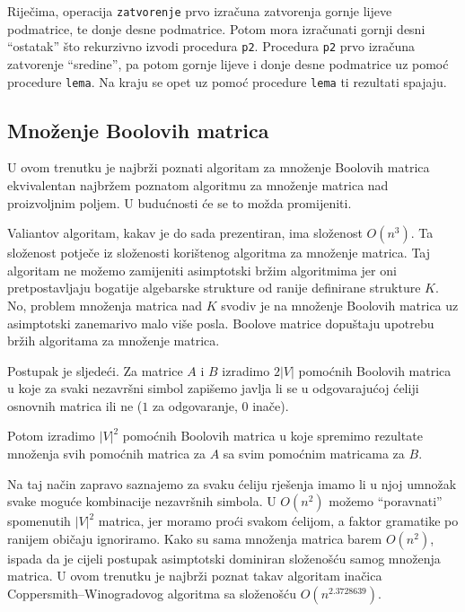 \documentclass[a4paper,oneside,12pt]{article} %
\begin{document}
    Riječima, operacija \verb|zatvorenje| prvo izračuna 
        zatvorenja gornje lijeve podmatrice, te donje desne podmatrice.
    Potom mora izračunati gornji desni ``ostatak''
        što rekurzivno izvodi procedura \verb|p2|.
    Procedura \verb|p2| prvo izračuna zatvorenje ``sredine'',
        pa potom gornje lijeve i donje desne podmatrice uz pomoć procedure \verb|lema|. 
    Na kraju se opet uz pomoć procedure \verb|lema| ti rezultati spajaju.
       
    
    \subsection{Množenje Boolovih matrica}
    
    U ovom trenutku je najbrži poznati algoritam za množenje Boolovih matrica
        ekvivalentan najbržem poznatom algoritmu za množenje matrica nad proizvoljnim poljem.
    U budućnosti će se to možda promijeniti.
    
    Valiantov algoritam, kakav je do sada prezentiran, ima složenost $O(n^3)$.
    Ta složenost potječe iz složenosti korištenog algoritma za množenje matrica.
    Taj algoritam ne možemo zamijeniti asimptotski bržim algoritmima jer oni pretpostavljaju
        bogatije algebarske strukture od ranije definirane strukture $K$.
    No, problem množenja matrica nad $K$ svodiv je na množenje Boolovih matrica
        uz asimptotski zanemarivo malo više posla. 
    Boolove matrice dopuštaju upotrebu bržih algoritama za množenje matrica.
    
    Postupak je sljedeći. 
    Za matrice $A$ i $B$ izradimo $2|V|$ pomoćnih Boolovih matrica 
        u koje za svaki nezavršni simbol zapišemo javlja li se u odgovarajućoj ćeliji
        osnovnih matrica ili ne ($1$ za odgovaranje, $0$ inače).
       
    Potom izradimo $|V|^2$ pomoćnih Boolovih matrica u koje spremimo rezultate
        množenja svih pomoćnih matrica za $A$ sa svim pomoćnim matricama za $B$.
    
    Na taj način zapravo saznajemo za svaku ćeliju rješenja imamo 
        li u njoj umnožak svake moguće kombinacije nezavršnih simbola.
    U $O(n^2)$ možemo ``poravnati'' spomenutih $|V|^2$ matrica,
        jer moramo proći svakom ćelijom, a faktor gramatike po ranijem običaju ignoriramo.
    Kako su sama množenja matrica barem $O(n^2)$, 
        ispada da je cijeli postupak asimptotski dominiran složenošću samog množenja matrica.
    U ovom trenutku je najbrži poznat takav algoritam 
        inačica Coppersmith–Winogradovog algoritma sa složenošću $O(n^{2.3728639})$.
        
\end{document}
